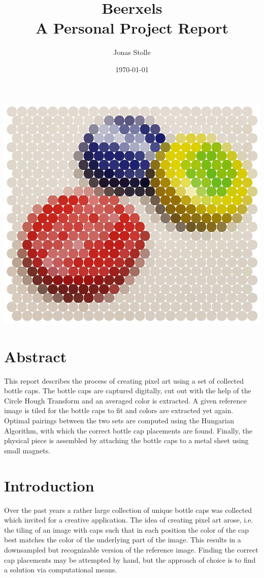 \documentclass{article}
\title{Beerxels \\
	\large A Personal Project Report}
\author{Jonas Stolle}
\date{\today}
\begin{document}
\begin{titlepage}
\maketitle
\centering
	\includegraphics[width=0.8\linewidth]{caps_pics-circles.jpg}
\end{titlepage}

\section{Abstract}
This report describes the process of creating pixel art using a set of collected bottle caps. The bottle caps are captured digitally, cut out with the help of the Circle Hough Transform and an averaged color is extracted. A given reference image is tiled for the bottle caps to fit and colors are extracted yet again. Optimal pairings between the two sets are computed using the Hungarian Algorithm, with which the correct bottle cap placements are found. Finally, the physical piece is assembled by attaching the bottle caps to a metal sheet using small magnets. 

\section{Introduction}

Over the past years a rather large collection of unique bottle caps was collected which invited for a creative application. 
The idea of creating pixel art arose, i.e. the tiling of an image with caps such that in each position the color of the cap best matches the color of the underlying part of the image. This results in a downsampled but recognizable version of the reference image. Finding the correct cap placements may be attempted by hand, but the approach of choice is to find a solution via computational means.
\end{document}
